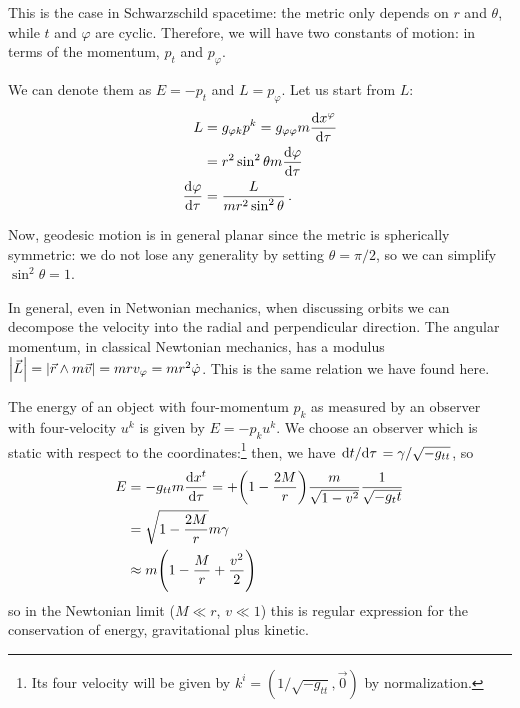 \documentclass[main.tex]{subfiles}
\begin{document}
This is the case in Schwarzschild spacetime: the metric only depends on \(r\) and \(\theta \), while \(t\) and \(\varphi \) are cyclic. 
Therefore, we will have two constants of motion: in terms of the momentum, \(p_t\) and \(p_{\varphi }\). 

We can denote them as \(E = - p_t\) and \(L = p_\varphi \). 
Let us start from \(L\):
%
\begin{align}
L &= g_{\varphi k} p^{k} = g_{\varphi \varphi } m \dv{x^{\varphi }}{\tau }  \\
&= r^2 \sin^2 \theta m \dv{\varphi }{\tau } \\
\dv{\varphi }{\tau } &= \frac{L}{m r^2 \sin^2 \theta }
\,.
\end{align}

Now, geodesic motion is in general planar since the metric is spherically symmetric: we do not lose any generality by setting \(\theta = \pi /2\), so we can simplify \(\sin^2 \theta = 1\).

In general, even in Netwonian mechanics, when discussing orbits we can decompose the velocity into the radial and perpendicular direction. 
The angular momentum, in classical Newtonian mechanics, has a modulus \( \abs{\vec{L}} = \abs{\vec{r} \wedge m \vec{v}} = mr v_\varphi = mr^2 \dot{\varphi} \). This is the same relation we have found here.  

The energy of an object with four-momentum \(p_k\) as measured by an observer with four-velocity \(u^{k}\) is given by \(E = - p_k u^{k}\). 
We choose an observer which is static with respect to the coordinates:\footnote{Its four velocity will be given by \(k^{i} = (1 / \sqrt{-g_{tt}}, \vec{0})\) by normalization.}
then, we have \(\dv*{t}{\tau } = \gamma / \sqrt{- g_{tt}} \), so
%
\begin{align}
E &= -g_{tt} m \dv{x^{t}}{\tau } = 
+ \qty(1 - \frac{2M}{r}) \frac{m}{\sqrt{1 - v^2}} \frac{1}{\sqrt{- g_tt}} \\ 
&= \sqrt{1 - \frac{2M}{r}} m \gamma 
 \\
&\approx m \qty(1 - \frac{M}{r} + \frac{v^2}{2})
\,
\end{align}
%
so in the Newtonian limit (\(M \ll r\), \(v \ll 1\)) this is regular expression for the conservation of energy, gravitational plus kinetic.
\end{document}
